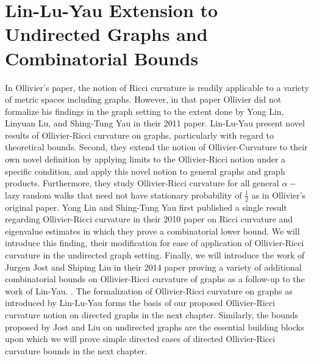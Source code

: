 \documentclass{Dissertate}
\theoremstyle{definition}
\theoremstyle{definition} %
\theoremstyle{definition}
\begin{document}
\chapter[Lin-Lu-Yau Extension to Undirected Graphs and Combinatorial Bounds]{Lin-Lu-Yau Extension to Undirected Graphs and Combinatorial Bounds}

In Ollivier's paper, the notion of Ricci curvature is readily applicable to a variety of metric spaces including graphs. However, in that paper Ollivier did not formalize his findings in the graph setting to the extent done by Yong Lin, Linyuan Lu, and Shing-Tung Yau in their 2011 paper. Lin-Lu-Yau \cite{lin2011ricci} present novel results of Ollivier-Ricci curvature on graphs, particularly with regard to theoretical bounds. Second, they extend the notion of Ollivier-Curvature to their own novel definition by applying limits to the Ollivier-Ricci notion under a specific condition, and apply this novel notion to general graphs and graph products. Furthermore, they study Ollivier-Ricci curvature for all general $\alpha-$lazy random walks that need not have stationary probability of $\frac{1}{2}$ as in Ollivier's original paper. Yong Lin and Shing-Tung Yau \cite{lin2010ricci} first published a single result regarding Ollivier-Ricci curvature in their 2010 paper on Ricci curvature and eigenvalue estimates in which they prove a combinatorial lower bound. We will introduce this finding, their modification for ease of application of Ollivier-Ricci curvature in the undirected graph setting. Finally, we will introduce the work of Jurgen Jost and Shiping Liu in their 2014 paper proving a variety of additional combinatorial bounds on Ollivier-Ricci curvature of graphs as a follow-up to the work of Lin-Yau. \cite{jost_olliviers_2014}. The formalization of Ollivier-Ricci curvature on graphs as introduced by Lin-Lu-Yau forms the basis of our proposed Ollivier-Ricci curvature notion on directed graphs in the next chapter. Similarly, the bounds proposed by Jost and Liu on undirected graphs are the essential building blocks upon which we will prove simple directed cases of directed Ollivier-Ricci curvature bounds in the next chapter. 
\end{document}
